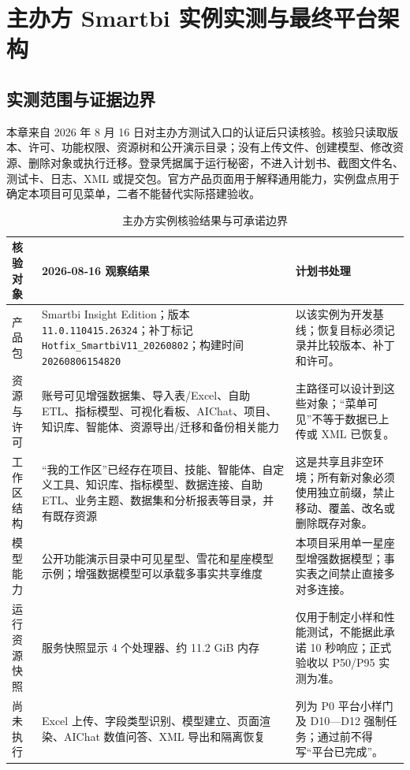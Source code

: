 \documentclass[UTF8,fontset=windows,12pt,openany]{ctexbook}
\newcommand{\Field}[1]{{\small\nolinkurl{#1}}}
\begin{document}
\chapter{主办方 Smartbi 实例实测与最终平台架构}

\section{实测范围与证据边界}

本章来自 2026 年 8 月 16 日对主办方测试入口的认证后只读核验。核验只读取版本、许可、功能权限、资源树和公开演示目录；没有上传文件、创建模型、修改资源、删除对象或执行迁移。登录凭据属于运行秘密，不进入计划书、截图文件名、测试卡、日志、XML 或提交包。官方产品页面用于解释通用能力，实例盘点用于确定本项目可见菜单，二者不能替代实际搭建验收\cite{smartbiversion,smartbiprepare,smartbiaichat,smartbiinstance}。

\begin{longtable}{p{3.4cm}p{6.8cm}p{3.8cm}}
\caption{主办方实例核验结果与可承诺边界}\label{tab:smartbi-instance-audit}\\
\toprule
\textbf{核验对象} & \textbf{2026-08-16 观察结果} & \textbf{计划书处理}\\
\midrule
产品包 & Smartbi Insight Edition；版本 \Field{11.0.110415.26324}；补丁标记 \Field{Hotfix_SmartbiV11_20260802}；构建时间 \Field{20260806154820} & 以该实例为开发基线；恢复目标必须记录并比较版本、补丁和许可。\\
资源与许可 & 账号可见增强数据集、导入表/Excel、自助 ETL、指标模型、可视化看板、AIChat、项目、知识库、智能体、资源导出/迁移和备份相关能力 & 主路径可以设计到这些对象；“菜单可见”不等于数据已上传或 XML 已恢复。\\
工作区结构 & “我的工作区”已经存在项目、技能、智能体、自定义工具、知识库、指标模型、数据连接、自助 ETL、业务主题、数据集和分析报表等目录，并有既存资源 & 这是共享且非空环境；所有新对象必须使用独立前缀，禁止移动、覆盖、改名或删除既存对象。\\
模型能力 & 公开功能演示目录中可见星型、雪花和星座模型示例；增强数据模型可以承载多事实共享维度 & 本项目采用单一星座型增强数据模型；事实表之间禁止直接多对多连接。\\
运行资源快照 & 服务快照显示 4 个处理器、约 11.2 GiB 内存 & 仅用于制定小样和性能测试，不能据此承诺 10 秒响应；正式验收以 P50/P95 实测为准。\\
尚未执行 & Excel 上传、字段类型识别、模型建立、页面渲染、AIChat 数值问答、XML 导出和隔离恢复 & 列为 P0 平台小样门及 D10—D12 强制任务；通过前不得写“平台已完成”。\\
\bottomrule
\end{longtable}
\end{document}

